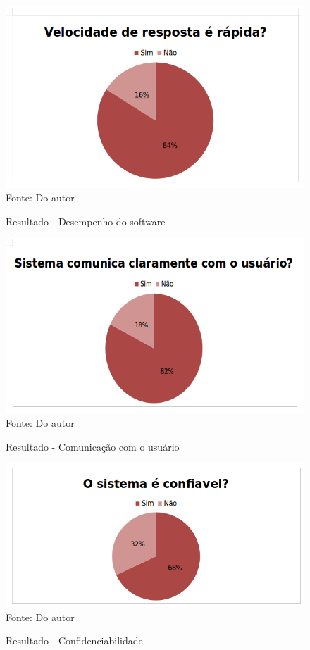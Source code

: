 \begin{figure}[H]
	\centering 
	\caption{Resultado - Desempenho do software}
	\label{resultado-rapido}
	\includegraphics[scale = 0.6]{imagens/resul-rapido.png}
	\\Fonte: Do autor
\end{figure}


\begin{figure}[H]
	\centering 
	\caption{Resultado - Comunicação com o usuário}
	\label{resultado-comunica}
	\includegraphics[scale = 0.7]{imagens/resultado-comunica.png}
	\\Fonte: Do autor
\end{figure}

\begin{figure}[H]
	\centering 
	\caption{Resultado - Confidenciabilidade}
	\label{resultado-confi}
	\includegraphics[scale = 0.7]{imagens/resultado-confiavel.png}
	\\Fonte: Do autor
\end{figure}